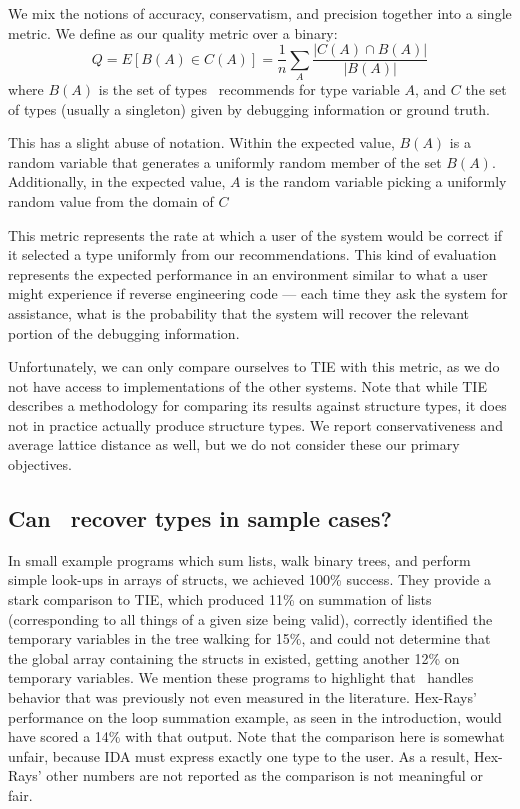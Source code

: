 We mix the notions of accuracy, conservatism, and precision together into a single metric. We define as our quality metric over a binary:
\[
Q = E[B(A) \in C(A)] = \frac{1}{n}\sum_{A} \frac{|C(A) \cap B(A)|}{|B(A)|}
\]
where $B(A)$ is the set of types \bitr\ recommends for type variable $A$, and $C$ the set of types (usually a singleton) given by debugging information or ground truth.

This has a slight abuse of notation. Within the expected value, $B(A)$ is a random variable that generates a uniformly random member of the set $B(A)$. Additionally, in the expected value, $A$ is the random variable picking a uniformly random value from the domain of $C$

This metric represents the rate at which a user of the system would be correct if it selected a type uniformly from our recommendations. This kind of evaluation represents the expected performance in an environment similar to what a user might experience if reverse engineering code --- each time they ask the system for assistance, what is the probability that the system will recover the relevant portion of the debugging information.

Unfortunately, we can only compare ourselves to TIE with this metric, as we do not have access to implementations of the other systems. Note that while TIE describes a methodology for comparing its results against structure types, it does not in practice actually produce structure types. We report conservativeness and average lattice distance as well, but we do not consider these our primary objectives.

\subsection{Can \bitr\ recover types in sample cases?}
In small example programs which sum lists, walk binary trees, and perform simple look-ups in arrays of structs, we achieved 100\% success. They provide a stark comparison to TIE, which produced 11\% on summation of lists (corresponding to all things of a given size being valid), correctly identified the temporary variables in the tree walking for 15\%, and could not determine that the global array containing the structs in existed, getting another 12\% on temporary variables. We mention these programs to highlight that \bitr\ handles behavior that was previously not even measured in the literature. Hex-Rays'~\cite{ida} performance on the loop summation example, as seen in the introduction, would have scored a 14\% with that output. Note that the comparison here is somewhat unfair, because IDA must express exactly one type to the user. As a result, Hex-Rays' other numbers are not reported as the comparison is not meaningful or fair.

